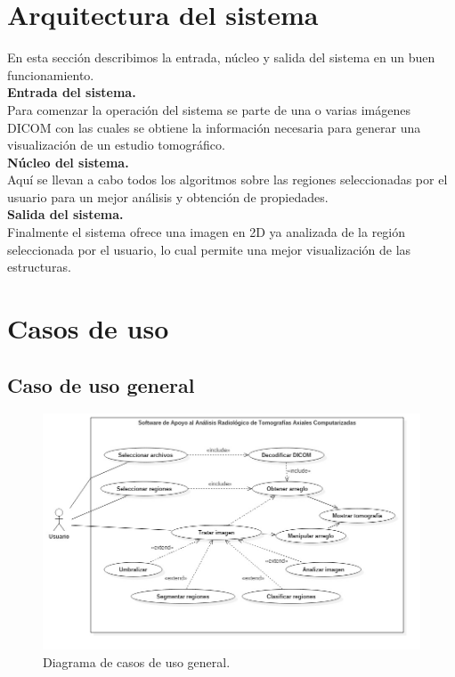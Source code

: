 \documentclass[12pt]{report}
\begin{document}
\section{Arquitectura del sistema}
En esta sección describimos la entrada, núcleo y salida del sistema en un buen funcionamiento. \\
\textbf{Entrada del sistema.}\\ Para comenzar la operación del sistema se parte de una o varias imágenes DICOM con las cuales se obtiene la información necesaria para generar una visualización de un estudio tomográfico.\\
\textbf{Núcleo del sistema.}\\ Aquí se llevan a cabo todos los algoritmos sobre las regiones seleccionadas por el usuario para un mejor análisis y obtención de propiedades.\\
\textbf{Salida del sistema.}\\ Finalmente el sistema ofrece una imagen en 2D ya analizada de la región seleccionada  por el usuario, lo cual permite una mejor visualización de las estructuras.\\

\section{Casos de uso}
\subsection{Caso de uso general}

\begin{figure}[H]
\centering
\includegraphics[width = 13 cm, height =  10 cm]{MainCasos}
\caption{Diagrama de casos de uso general.}
\end{figure}
\end{document}
